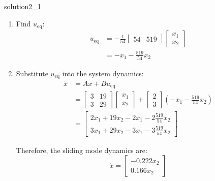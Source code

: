 \begin{solution}{}{solution2_1}
\begin{enumerate}
		\item Find \( u_{\text{eq}} \):
		      \[
			      \begin{aligned}
				      u_{\text{eq}} & = -\frac{1}{54} \begin{bmatrix} 54 & 519 \end{bmatrix}
				      \begin{bmatrix}
					      x_1 \\ x_2
				      \end{bmatrix}                                                         \\
				                    & = -x_1 - \frac{519}{54} x_2
			      \end{aligned}
		      \]

		\item Substitute \( u_{\text{eq}} \) into the system dynamics:
		      \[
			      \begin{aligned}
				      \dot{x} & = Ax + Bu_{\text{eq}}                      \\
				              & = \begin{bmatrix}
					                  3 & 19 \\
					                  3 & 29
				                  \end{bmatrix}
				      \begin{bmatrix}
					      x_1 \\ x_2
				      \end{bmatrix}
				      + \begin{bmatrix}
					        2 \\ 3
				        \end{bmatrix}
				      \left( -x_1 - \frac{519}{54}x_2 \right)              \\
				              & = \begin{bmatrix}
					                  2x_1 + 19x_2 - 2x_1 - 2\frac{519}{54}x_2 \\
					                  3x_1 + 29x_2 - 3x_1 - 3\frac{519}{54}x_2
				                  \end{bmatrix}
			      \end{aligned}
		      \]

		      Therefore, the sliding mode dynamics are:
		      \[
			      \dot{x} = \begin{bmatrix}
				      -0.222x_2 \\
				      0.166x_2
			      \end{bmatrix}
		      \]
	\end{enumerate}


\end{solution}

